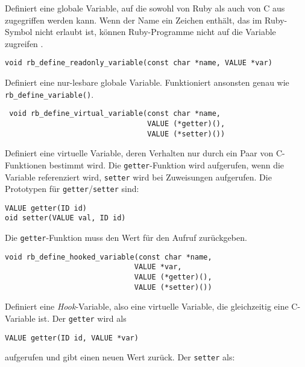 \noindent Definiert eine globale Variable, auf die sowohl von Ruby als
auch von C aus zugegriffen werden kann. Wenn der Name ein Zeichen
enthält, das im Ruby-Symbol nicht erlaubt ist, können Ruby-Programme
nicht auf die Variable zugreifen .

\begin{lstlisting}
void rb_define_readonly_variable(const char *name, VALUE *var)
\end{lstlisting}

\noindent Definiert eine nur-lesbare globale Variable. Funktioniert
ansonsten genau wie \verb+rb_define_variable()+.

\begin{lstlisting}
 void rb_define_virtual_variable(const char *name,
                                 VALUE (*getter)(),
                                 VALUE (*setter)())
\end{lstlisting}

\noindent Definiert eine virtuelle Variable, deren Verhalten nur durch
ein Paar von C-Funktionen bestimmt wird. Die \verb+getter+-Funktion
wird aufgerufen, wenn die Variable referenziert wird, \verb+setter+
wird bei Zuweisungen aufgerufen. Die Prototypen für
\verb+getter+/\verb+setter+ sind:

\begin{lstlisting}
VALUE getter(ID id)
oid setter(VALUE val, ID id)
\end{lstlisting}

\noindent Die \verb+getter+-Funktion muss den Wert für den Aufruf
zurückgeben.

\begin{lstlisting}
void rb_define_hooked_variable(const char *name,
                              VALUE *var,
                              VALUE (*getter)(),
                              VALUE (*setter)())
\end{lstlisting}

\noindent Definiert eine \emph{Hook}-Variable, also eine virtuelle
Variable, die gleichzeitig eine C-Variable ist. Der \verb+getter+ wird
als

\begin{lstlisting}
VALUE getter(ID id, VALUE *var)
\end{lstlisting}

\noindent aufgerufen und gibt einen neuen Wert zurück. Der
\verb+setter+ als:

